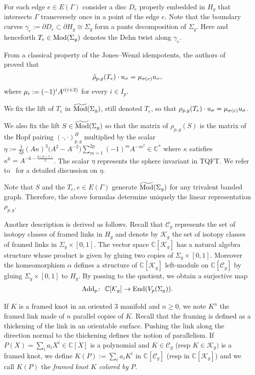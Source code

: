 \documentclass[11pt]{article}
\numberwithin{equation}{section}
\begin{document}
For each edge $e\in E(\Gamma)$ consider a disc $D_e$ properly embedded in $H_g$ that intersects $\Gamma$ transversely once in a point of the edge $e$. Note that the boundary curves $\gamma_e := \partial D_e \subset \partial H_g \cong \Sigma_g$ form a pants decomposition of $\Sigma_g$. Here and henceforth $T_e\in \operatorname{Mod}(\Sigma_g)$ denotes the Dehn twist along $\gamma_e$.

From a classical property of the Jones--Wenzl idempotents, the authors of~\cite{BHMV2} proved that
\begin{gather*} \tilde{\rho}_{p,g}(T_e) \cdot u_{\sigma} = \mu_{\sigma(e)} u_{\sigma}, \end{gather*}
where $\mu_{i} := (-1)^i A^{i(i+2)}$ for every $i\in I_p$.

We fix the lift of $T_e$ in $\widetilde{\operatorname{Mod}}(\Sigma_g)$, still denoted $T_e$, so that $ \rho_{p,g}(T_e) \cdot u_{\sigma} = \mu_{\sigma(e)} u_{\sigma}$.

We also fix the lift $S\in\widetilde{\operatorname{Mod}}(\Sigma_g)$ so that the matrix of $\rho_{p,g}(S)$ is the matrix of the Hopf pairing $(\cdot, \cdot )^H_{p,g}$ multiplied by the scalar $\eta:=\frac{1}{2p}(A\kappa)^3\big(A^2-A^{-2}\big)\sum\limits_{m=1}^{2p}{(-1)^mA^{-m^2}}\in \mathbb{C}^*$ where $\kappa$ satisfies $\kappa^6=A^{-6-\frac{p(p+1)}{2}}$. The scalar $\eta$ represents the sphere invariant in TQFT. We refer to~\cite{BHMV2} for a detailed discussion on $\eta$.

 Note that $S$ and the $ T_e, e\in E(\Gamma)$ generate $\widetilde{\operatorname{Mod}}(\Sigma_g)$ for any trivalent banded graph. Therefore, the above formulas determine uniquely the linear representation $\rho_{p,g}$.

Another description is derived as follows. Recall that $\mathcal{C}_g$ represents the set of isotopy classes of framed links in $H_g$ and denote by $\mathcal{K}_g$ the set of isotopy classes of framed links in $\Sigma_g\times [0,1]$. The vector space $\mathbb{C}[\mathcal{K}_g]$ has a natural algebra structure whose product is given by gluing two copies of $\Sigma_g\times[0,1]$. Moreover the homeomorphism $\alpha$ defines a structure of $\mathbb{C}[\mathcal{K}_g]$ left-module on $\mathbb{C}[\mathcal{C}_g]$ by gluing $\Sigma_g\times[0,1]$ to $H_g$. By passing to the quotient, we obtain a surjective map
\begin{gather*} \operatorname{Add}_p \colon \ \mathbb{C}[\mathcal{K}_g] \rightarrow \operatorname{End}(V_p(\Sigma_g)).\end{gather*}

If $K$ is a framed knot in an oriented $3$ manifold and $n\geq 0$, we note $K^n$ the framed link made of $n$ parallel copies of $K$. Recall that the framing is defined as a thickening of the link in an orientable surface. Pushing the link along the direction normal to the thickening defines the notion of parallelism. If $P(X)=\sum_i a_i X^i \in \mathbb{C}[X]$ is a polynomial and $K\in \mathcal{C}_g$ (resp $K\in \mathcal{K}_g)$ is a framed knot, we define $K(P):=\sum_i a_i K^i $ in $\mathbb{C}[\mathcal{C}_g]$ (resp in $\mathbb{C}[\mathcal{K}_g]$) and we call $K(P)$ the \textit{framed knot $K$ colored by $P$}.
\end{document}
